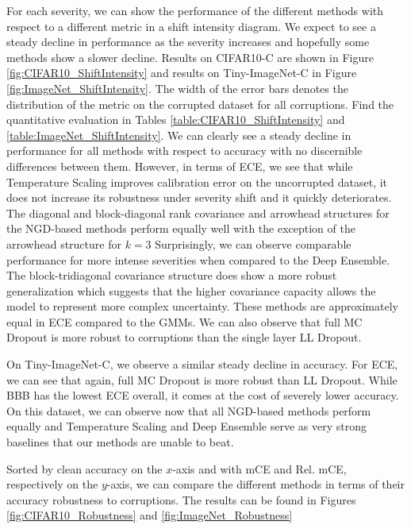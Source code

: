 \documentclass[a4paper, 11pt, oneside]{scrartcl}
\theoremstyle{break}
\numberwithin{equation}{section}
\begin{document}
			For each severity, we can show the performance of the different methods with respect to a different metric in a shift intensity diagram. 
			We expect to see a steady decline in performance as the severity increases and hopefully some methods show a slower decline. 
			Results on CIFAR10-C are shown in Figure \ref{fig:CIFAR10_ShiftIntensity} and results on Tiny-ImageNet-C in Figure \ref{fig:ImageNet_ShiftIntensity}.
			The width of the error bars denotes the distribution of the metric on the corrupted dataset for all corruptions.
			Find the quantitative evaluation in Tables \ref{table:CIFAR10_ShiftIntensity} and \ref{table:ImageNet_ShiftIntensity}.
			We can clearly see a steady decline in performance for all methods with respect to accuracy with no discernible differences between them. 
			However, in terms of ECE, we see that while Temperature Scaling improves calibration error on the uncorrupted dataset, it does not increase its robustness under severity shift and it quickly deteriorates. 
			The diagonal and block-diagonal rank covariance and arrowhead structures for the NGD-based methods perform equally well with the exception of the arrowhead structure for $k = 3$
			Surprisingly, we can observe comparable performance for more intense severities when compared to the Deep Ensemble. 
			The block-tridiagonal covariance structure does show a more robust generalization which suggests that the higher covariance capacity allows the model to represent more complex uncertainty. 
			These methods are approximately equal in ECE compared to the GMMs. 
			We can also observe that full MC Dropout is more robust to corruptions than the single layer LL Dropout. 

			On Tiny-ImageNet-C, we observe a similar steady decline in accuracy.
			For ECE, we can see that again, full MC Dropout is more robust than LL Dropout. 
			While BBB has the lowest ECE overall, it comes at the cost of severely lower accuracy. 
			On this dataset, we can observe now that all NGD-based methods perform equally and Temperature Scaling and Deep Ensemble serve as very strong baselines that our methods are unable to beat. 

			Sorted by clean accuracy on the $x$-axis and with mCE and Rel. mCE, respectively on the $y$-axis, we can compare the different methods in terms of their accuracy robustness to corruptions.
			The results can be found in Figures \ref{fig:CIFAR10_Robustness} and \ref{fig:ImageNet_Robustness}
\end{document}
